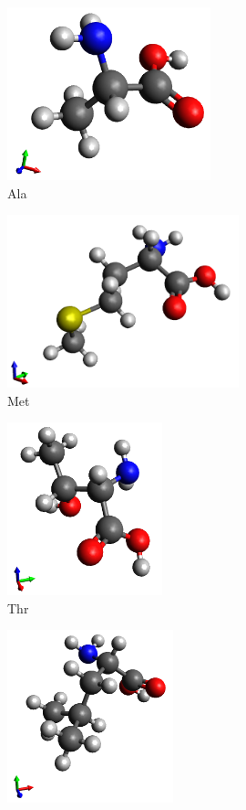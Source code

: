 \begin{figure}
\begin{subfigure}{.5\textwidth}
  \centering
  \includegraphics[height=5cm]{Figures/Ala.png}
  \caption{Ala}
  \label{fig:sfig1}
\end{subfigure}%
\begin{subfigure}{.5\textwidth}
  \centering
  \includegraphics[height=5cm]{Figures/Met.png}
  \caption{Met}
  \label{fig:sfig2}
\end{subfigure}
\begin{subfigure}{.5\textwidth}
  \centering
  \includegraphics[height=5cm]{Figures/Thr.png}
  \caption{Thr}
  \label{fig:sfig3}
\end{subfigure}
\begin{subfigure}{.5\textwidth}
  \centering
  \includegraphics[height=5cm]{Figures/Leu.png}

\end{subfigure}
\end{figure}
